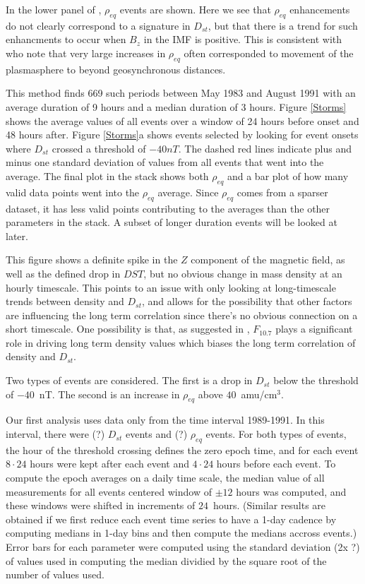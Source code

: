 \documentclass[10pt,twocolumn]{article}
\begin{document}
In the lower panel of \label{DailyAverages}, $\rho_{eq}$ events are shown.  Here we see that $\rho_{eq}$ enhancements do not clearly correspond to a signature in $D_{st}$, but that there is a trend for such enhancments to occur when $B_{z}$ in the IMF is positive.  This is consistent with \cite{Takahashi2010} who note that very large increases in $\rho_{eq}$ often corresponded to movement of the plasmasphere to beyond geosynchronous distances. 

This method finds 669 such periods between May 1983 and August 1991 with an average duration of 9 hours and a median duration of 3 hours. Figure \ref{Storms} shows the average values of all events over a window of 24 hours before onset and 48 hours after. Figure \ref{Storms}a shows events selected by looking for event onsets where $D_{st}$ crossed a threshold of $-40nT$. The dashed red lines indicate plus and minus one standard deviation of values from all events that went into the average. The final plot in the stack shows both $\rho_{eq}$ and a bar plot of how many valid data points went into the $\rho_{eq}$ average. Since $\rho_{eq}$ comes from a sparser dataset, it has less valid points contributing to the averages than the other parameters in the stack. A subset of longer duration events will be looked at later. 

This figure shows a definite spike in the $Z$ component of the magnetic field, as well as the defined drop in $DST$, but no obvious change in mass density at an hourly timescale. This points to an issue with only looking at long-timescale trends between density and $D_{st}$, and allows for the possibility that other factors are influencing the long term correlation since there's no obvious connection on a short timescale. One possibility is that, as suggested in \cite{Takahashi2010}, $F_{10.7}$ plays a significant role in driving long term density values which biases the long term correlation of density and $D_{st}$.

Two types of events are considered. The first is a drop in $D_{st}$ below the threshold of $-40$~nT.  The second is an increase in $\rho_{eq}$ above $40$~amu/cm$^3$.

Our first analysis uses data only from the time interval 1989-1991.  In this interval, there were (?) $D_{st}$ events and (?) $\rho_{eq}$ events.  For both types of events, the hour of the threshold crossing defines the zero epoch time, and for each event $8\cdot24$ hours were kept after each event and $4\cdot24$ hours before each event.  To compute the epoch averages on a daily time scale, the median value of all measurements for all events centered window of $\pm 12$ hours was computed, and these windows were shifted in increments of $24$~hours. (Similar results are obtained if we first reduce each event time series to have a 1-day cadence by computing medians in 1-day bins and then compute the medians accross events.)  Error bars for each parameter were computed using the standard deviation (2x ?) of values used in computing the median dividied by the square root of the number of values used.
\end{document}
